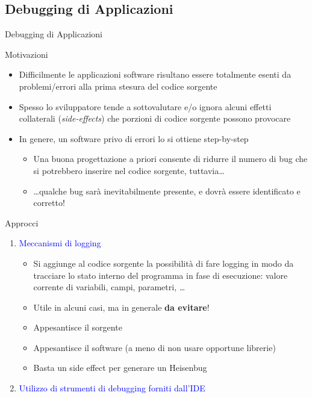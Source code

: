 \documentclass[presentation]{beamer}
\begin{document}
\subsection{Debugging di Applicazioni}
\begin{frame}[allowframebreaks]{Debugging di Applicazioni \cite{debugger,debugging}}
	\begin{block}{Motivazioni}
		\begin{itemize}
			\item Difficilmente le applicazioni software risultano essere totalmente esenti da problemi/errori alla prima stesura del codice sorgente
			\item Spesso lo sviluppatore tende a sottovalutare e/o ignora alcuni effetti collaterali (\emph{side-effects}) che porzioni di codice sorgente possono provocare
			\item In genere, un software privo di errori lo si ottiene step-by-step
			\begin{itemize}
				\item Una buona progettazione a priori consente di ridurre il numero di bug che si potrebbero inserire nel codice sorgente, tuttavia\dots
				\item \dots qualche bug sarà inevitabilmente presente, e dovrà essere identificato e corretto!
			\end{itemize}
		\end{itemize}
	\end{block}
	\begin{block}{Approcci}
		\begin{enumerate}
			\item \textcolor{blue}{Meccanismi di logging}
			\begin{itemize}
				\item Si aggiunge al codice sorgente la possibilità di fare logging in modo da tracciare lo stato interno del programma in fase di esecuzione: valore corrente di variabili, campi, parametri, \dots
				\item Utile in alcuni casi, ma in generale \textbf{da evitare}!
				\item Appesantisce il sorgente
				\item Appesantisce il software (a meno di non usare opportune librerie)
				\item Basta un side effect per generare un Heisenbug \cite{heisenbug}
			\end{itemize}
			\item \textcolor{blue}{Utilizzo di strumenti di debugging forniti dall'IDE}
			\begin{itemize}

\end{itemize}
\end{enumerate}
\end{block}
\end{frame}
\end{document}
